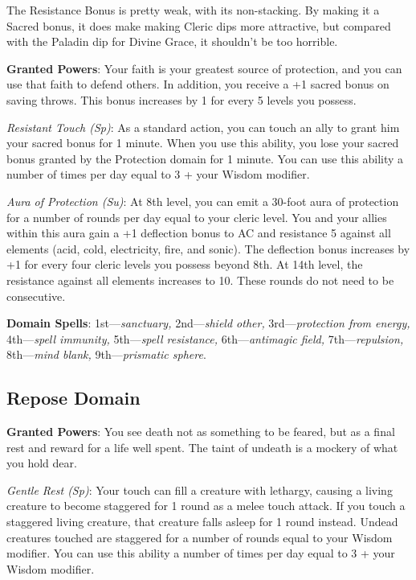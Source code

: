 \begin{formal}
 The Resistance Bonus is pretty weak, with its non-stacking. By making it a Sacred bonus, it does make making
 Cleric dips more attractive, but compared with the Paladin dip for Divine Grace, it shouldn't be too horrible.
\end{formal}

\textbf{Granted Powers}: Your faith is your greatest source of protection, and you can use that faith to defend 
others. In addition, you receive a +1 sacred bonus on saving throws. This bonus increases by 1 for every 5 
levels you possess. 

\textit{Resistant Touch (Sp)}: As a standard action, you can touch an ally to grant him your sacred bonus 
for 1 minute. When you use this ability, you lose your sacred bonus granted by the Protection domain for 1
minute. You can use this ability a number of times per day equal to 3 + your Wisdom modifier.
				
\textit{Aura of Protection (Su)}: At 8th level, you can emit a 30-foot aura of protection for a number of rounds
per day equal to your cleric level. You and your allies within this aura gain a +1 deflection bonus to AC and
resistance 5 against all elements (acid, cold, electricity, fire, and sonic). The deflection bonus increases by
+1 for every four cleric levels you possess beyond 8th. At 14th level, the resistance against all elements increases
to 10. These rounds do not need to be consecutive.
				
\textbf{Domain Spells}: 1st---\textit{sanctuary, }2nd---\textit{shield other,} 3rd---\textit{protection from energy, }4th---\textit{spell immunity, }5th---\textit{spell resistance, }6th---\textit{antimagic field, }7th---\textit{repulsion, }8th---\textit{mind blank, }9th---\textit{prismatic sphere}.
				
\subsection{Repose Domain}


\textbf{Granted Powers}: You see death not as something to be feared, but as a final rest and reward for a life well
spent. The taint of undeath is a mockery of what you hold dear.

\textit{Gentle Rest (Sp)}: Your touch can fill a creature with lethargy, causing a living creature to become
staggered for 1 round as a melee touch attack. If you touch a staggered living creature, that creature falls 
asleep for 1 round instead. Undead creatures touched are staggered for a number of rounds equal to your Wisdom
modifier. You can use this ability a number of times per day equal to 3 + your Wisdom modifier.

